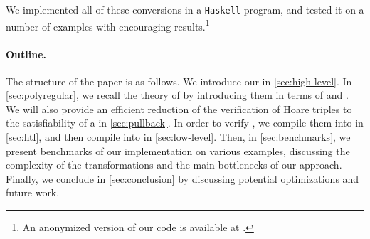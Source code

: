 We implemented all of these conversions in a \texttt{Haskell} program, and
tested it on a number of examples with encouraging results.\footnote{An anonymized
    version of our code is available at \repositoryUrl.}


\paragraph{Outline.} The structure of the paper is as follows. We introduce our
 in \cref{sec:high-level}. In \cref{sec:polyregular},
we recall the theory of  by introducing them in terms
of  and . We will also
provide an efficient reduction of the verification of Hoare triples to the
satisfiability of a  in \cref{sec:pullback}.
In order to verify , we compile them into  in \cref{sec:htl}, and then compile  into
 in \cref{sec:low-level}. 
%
Then, in \cref{sec:benchmarks}, we present
benchmarks of our implementation on various examples, discussing
the complexity of the transformations and the main bottlenecks of our approach.
Finally, we conclude in \cref{sec:conclusion} by discussing potential
optimizations and future work.

